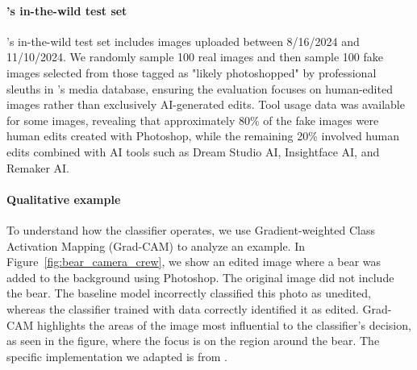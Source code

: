 






\paragraph{\truemedia's in-the-wild test set}

\truemedia's in-the-wild test set includes images uploaded between 8/16/2024 and 11/10/2024. We randomly sample 100  real images and then sample 100 fake images selected from those tagged as "likely photoshopped" by professional sleuths in \truemedia's media database, ensuring the evaluation focuses on human-edited images rather than exclusively AI-generated edits. Tool usage data was available for some images, revealing that approximately 80\% of the fake images were human edits created with Photoshop, while the remaining 20\% involved human edits combined with AI tools such as Dream Studio AI, Insightface AI, and Remaker AI.

\paragraph{Qualitative example}

To understand how the classifier operates, we use Gradient-weighted Class Activation Mapping (Grad-CAM) \cite{Selvaraju_2019} to analyze an example. In Figure~\ref{fig:bear_camera_crew}, we show an edited image where a bear was added to the background using Photoshop. The original image did not include the bear. The baseline model incorrectly classified this photo as unedited, whereas the classifier trained with \ours data correctly identified it as edited. Grad-CAM highlights the areas of the image most influential to the classifier’s decision, as seen in the figure, where the focus is on the region around the bear. The specific implementation we adapted is from \citet{jacobgilpytorchcam}.

